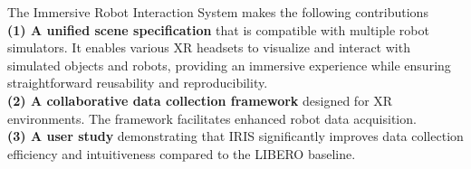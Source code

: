 The Immersive Robot Interaction System makes the following contributions\\
\textbf{(1) A unified scene specification} that is compatible with multiple robot simulators. It enables various XR headsets to visualize and interact with simulated objects and robots, providing an immersive experience while ensuring straightforward reusability and reproducibility.\\
\textbf{(2) A collaborative data collection framework} designed for XR environments. The framework facilitates enhanced robot data acquisition.\\
\textbf{(3) A user study} demonstrating that IRIS significantly improves data collection efficiency and intuitiveness compared to the LIBERO baseline.


